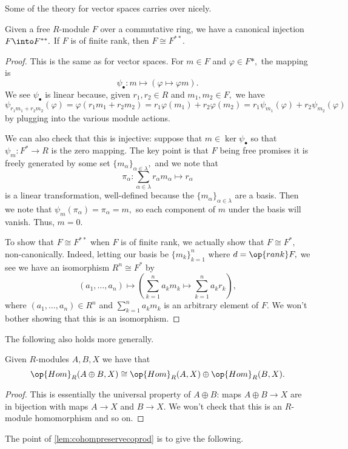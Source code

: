Some of the theory for vector spaces carries over nicely.
\begin{proposition}
	Given a free $R$-module $F$ over a commutative ring, we have a canonical injection $F\into F^{**}.$ If $F$ is of finite rank, then $F\cong F^{**}.$
\end{proposition}
\begin{proof}
	This is the same as for vector spaces. For $m\in F$ and $\varphi\in F*,$ the mapping is
	\[\psi_\bullet:m\mapsto(\varphi\mapsto\varphi m).\]
	We see $\psi_\bullet$ is linear because, given $r_1,r_2\in R$ and $m_1,m_2\in F,$ we have
	\[\psi_{r_1m_1+r_2m_2}(\varphi)=\varphi(r_1m_1+r_2m_2)=r_1\varphi(m_1)+r_2\varphi(m_2)=r_1\psi_{m_1}(\varphi)+r_2\psi_{m_2}(\varphi)\]
	by plugging into the various module actions.
	
	We can also check that this is injective: suppose that $m\in\ker\psi_\bullet$ so that $\psi_m:F^*\to R$ is the zero mapping. The key point is that $F$ being free promises it is freely generated by some set $\{m_\alpha\}_{\alpha\in\lambda},$ and we note that
	\[\pi_\alpha:\sum_{\alpha\in\lambda}r_\alpha m_\alpha\mapsto r_\alpha\]
	is a linear transformation, well-defined because the $\{m_\alpha\}_{\alpha\in\lambda}$ are a basis. Then we note that $\psi_m(\pi_\alpha)=\pi_\alpha=m,$ so each component of $m$ under the basis will vanish. Thus, $m=0.$

	To show that $F\cong F^{**}$ when $F$ is of finite rank, we actually show that $F\cong F^*,$ non-canonically. Indeed, letting our basis be $\{m_k\}_{k=1}^n$ where $d=\op{rank}F,$ we see we have an isomorphism $R^n\cong F^*$ by
	\[(a_1,\ldots,a_n)\mapsto\left(\sum_{k=1}^na_km_k\mapsto\sum_{k=1}^na_kr_k\right),\]
	where $(a_1,\ldots,a_n)\in R^n$ and $\sum_{k=1}^na_km_k$ is an arbitrary element of $F.$ We won't bother showing that this is an isomorphism.
\end{proof}
The following also holds more generally.
\begin{lemma} \label{lem:cohompreservecoprod}
	Given $R$-modules $A,B,X$ we have that
	\[\op{Hom}_R(A\oplus B,X)\cong\op{Hom}_R(A,X)\oplus\op{Hom}_R(B,X).\]
\end{lemma}
\begin{proof}
	This is essentially the universal property of $A\oplus B$: maps $A\oplus B\to X$ are in bijection with maps $A\to X$ and $B\to X.$ We won't check that this is an $R$-module homomorphism and so on.
\end{proof}
The point of \autoref{lem:cohompreservecoprod} is to give the following.
